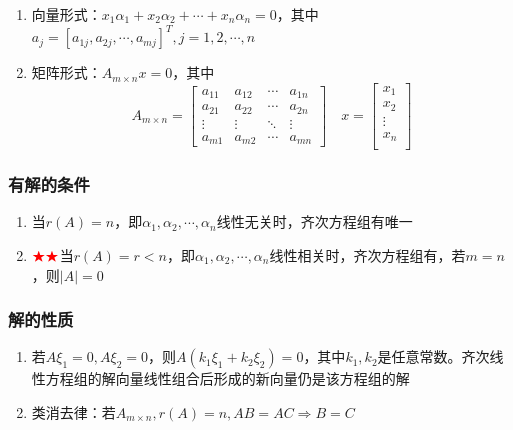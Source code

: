 \documentclass[./linear_algebra.tex]{subfiles}
\begin{document}
    \begin{enumerate}
        \item 向量形式：$x_1\alpha_1 + x_2\alpha_2 + \cdots + x_n\alpha_n = 0$，其中$a_j = [a_{1j}, a_{2j}, \cdots, a_{mj}]^T, j = 1, 2, \cdots, n$
        \item 矩阵形式：$A_{m\times n}x = 0$，其中
        \[
            A_{m\times n} = \begin{bmatrix}
                                a_{11} & a_{12} & \cdots & a_{1n} \\
                                a_{21} & a_{22} & \cdots & a_{2n} \\
                                \vdots & \vdots & \ddots & \vdots \\
                                a_{m1} & a_{m2} & \cdots & a_{mn}
            \end{bmatrix} \quad x = \begin{bmatrix}
                                        x_1 \\
                                        x_2 \\
                                        \vdots \\
                                        x_n \\
            \end{bmatrix}
        \]
    \end{enumerate}

    \subsubsection{有解的条件}

    \begin{enumerate}
        \item 当$r(A) = n$，即$\alpha_1, \alpha_2, \cdots, \alpha_n$线性无关时，齐次方程组有唯一{\color{red}{零解}}
        \item $\color{red}{\bigstar\bigstar}$当$r(A) = r < n$，即$\alpha_1, \alpha_2, \cdots, \alpha_n$线性相关时，齐次方程组有{\color{red}{非零解（无穷多解），且有$n - r(A)$个线性无关解}}，若$m = n$，则$|A| = 0$
    \end{enumerate}

    \subsubsection{解的性质}

    \begin{enumerate}
        \item 若$A\xi_1 = 0, A\xi_2 = 0$，则$A(k_1\xi_1 + k_2\xi_2) = 0$，其中$k_1, k_2$是任意常数。齐次线性方程组的解向量线性组合后形成的新向量仍是该方程组的解
        \item 类消去律：若$A_{m\times n}, r(A) = n, AB = AC \Rightarrow B = C$
    \end{enumerate}
\end{document}
